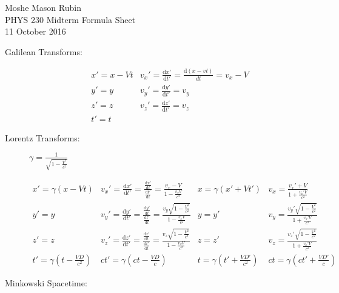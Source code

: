 \documentclass{article}
\begin{document}
		\begin{flushright}
		Moshe Mason Rubin\\PHYS 230 Midterm Formula Sheet\\11 October 2016
	\end{flushright}
	
	\begin{description}
		\item[Galilean Transforms:] \[\begin{array}{cc}
		x'=x-Vt &  v_x'=\frac{\mathrm{d}x'}{\mathrm{d}t'}=\frac{\mathrm{d}\left(x-vt\right)}{dt}=v_x-V\\ 
		y'=y &  v_y'=\frac{\mathrm{d}y'}{\mathrm{d}t'}=v_y\\ 
		z'=z &  v_z'=\frac{\mathrm{d}z'}{\mathrm{d}t'}=v_z\\ 
		t'=t & 
		\end{array} \]
		\item[Lorentz Transforms:] $\gamma=\frac{1}{\sqrt{1-\frac{V^2}{c^2}}}$ 
		
		\[\begin{array}{cc|cc}
		x'=\gamma(x-Vt)	&	v_x'=\frac{\mathrm{d}x'}{\mathrm{d}t'}=\frac{\frac{\mathrm{d}x'}{\mathrm{d}t}}{\frac{\mathrm{d}t'}{\mathrm{d}t}} = \frac{v_x-V}{1-\frac{v_xV}{c^2}}	&	x=\gamma\left(x'+Vt'\right)	&	v_x=\frac{v_x'+V}{1+\frac{v_x'V}{c^2}}\\
		y'=y	&	v_y'=\frac{\mathrm{d}y'}{\mathrm{d}t'}=\frac{\frac{\mathrm{d}y'}{\mathrm{d}t}}{\frac{\mathrm{d}t'}{\mathrm{d}t}}=\frac{v_y\sqrt{1-\frac{V^2}{c^2}}}{1-\frac{v_xV}{c^2}}	&	y=y'	&	v_y=\frac{v_y'\sqrt{1-\frac{V^2}{c^2}}}{1+\frac{v_x'V}{c^2}}\\
		z'=z	&	v_z'=\frac{\mathrm{d}z'}{\mathrm{d}t'}=\frac{\frac{\mathrm{d}z'}{\mathrm{d}t}}{\frac{\mathrm{d}t'}{\mathrm{d}t}}=\frac{v_z\sqrt{1-\frac{V^2}{c^2}}}{1-\frac{v_xV}{c^2}}	&	z=z'	&	v_z=\frac{v_z'\sqrt{1-\frac{V^2}{c^2}}}{1+\frac{v_x'V}{c^2}}\\
		t'=\gamma\left(t-\frac{VD}{c^2}\right)	&	ct'=\gamma\left(ct-\frac{VD}{c}\right)	&	t=\gamma\left(t'+\frac{VD'}{c^2}\right)	&	ct=\gamma\left(ct'+\frac{VD'}{c}\right)
		\end{array}\]
		
		
		\item [Minkowski Spacetime:]\hfill\\
	\end{description}
\end{document}
